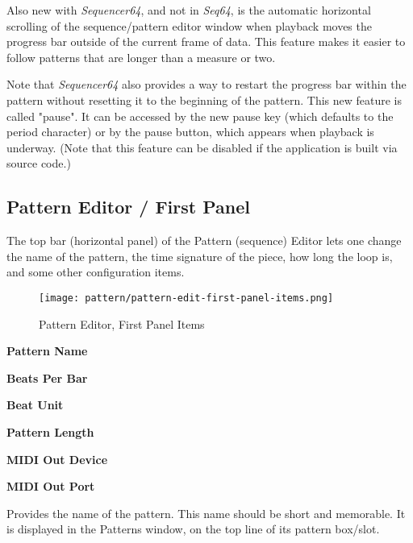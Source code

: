   Also new with \textsl{Sequencer64}, and not in \textsl{Seq64}, is the
   automatic horizontal scrolling of the sequence/pattern editor window when
   playback moves the progress bar outside of the current frame of data.  This
   feature makes it easier to follow patterns that are longer than a measure or
   two.
   
   Note that \textsl{Sequencer64} also provides a way to restart the progress
   bar within the pattern without resetting it to the beginning of the pattern.
    This new feature is called "pause".  It can be accessed by the
   new pause key (which defaults to the period character) or by the pause
   button, which appears when playback is underway.  (Note that this feature
   can be disabled if the application is built via source code.)

\subsection{Pattern Editor / First Panel}
\label{subsec:seq64_pattern_editor_first}

   The top bar (horizontal panel) of the Pattern (sequence) Editor
   lets one change the name of
   the pattern, the time signature of the piece, how long the loop is, and
   some other configuration items.

\begin{figure}[H]
   \centering 
   \texttt{[image: pattern/pattern-edit-first-panel-items.png]}
   \caption{Pattern Editor, First Panel Items}
   \label{fig:pattern_editor_first_panel_items}
\end{figure}

   \begin{enumber}
      \item \textbf{Pattern Name}
      \item \textbf{Beats Per Bar}
      \item \textbf{Beat Unit}
      \item \textbf{Pattern Length}
      \item \textbf{MIDI Out Device}
      \item \textbf{MIDI Out Port}
   \end{enumber}

   \setcounter{ItemCounter}{0}      %

   Provides the name of the pattern.
   This name should be short and memorable.
   It is displayed in the Patterns window, on the top line of its pattern
   box/slot.

